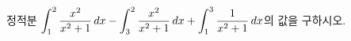 정적분 $\displaystyle\int_{1}^{2}\dfrac{x^2}{x^2+1}\mkern3mu dx-\int_{3}^{2}\dfrac{x^2}{x^2+1}\mkern3mu dx+\int_{1}^{3}\dfrac{1}{x^2+1}\mkern3mu dx$의 값을 구하시오.
